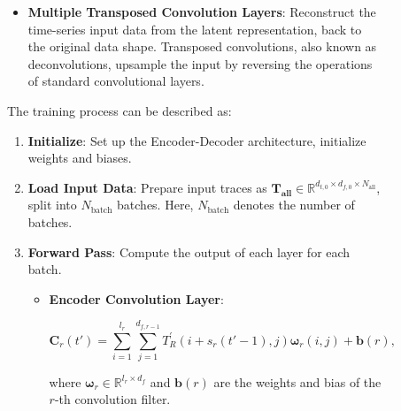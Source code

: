 \begin{figure}[!htbp]
{\begin{enumerate}
        \begin{itemize}
            \item \textbf{Multiple Transposed Convolution Layers}: Reconstruct the time-series input data from the latent representation, back to the original data shape. Transposed convolutions, also known as deconvolutions, upsample the input by reversing the operations of standard convolutional layers.
        \end{itemize}
\end{enumerate}
The training process can be described as:
\begin{enumerate}
\setcounter{enumi}{0}
\renewcommand{\theenumi}{\Roman{enumi}}
\renewcommand{\labelenumi}{\theenumi)}
    \item \textbf{Initialize}: Set up the Encoder-Decoder architecture, initialize weights and biases.
    \item \textbf{Load Input Data}: Prepare input traces as $\mathbf{T_{\text{all}}} \in \mathbb{R}^{ d_{t,0} \times d_{f,0} \times N_{\text{all}}}$, split into $N_{\text{batch}}$ batches. Here, $N_{\text{batch}}$ denotes the number of batches.
    \item \textbf{Forward Pass}: Compute the output of each layer for each batch.
    
    \begin{itemize}
        \item \textbf{Encoder Convolution Layer}:
        \begin{footnotesize}
        \begin{equation}
        \boldsymbol{C}_r(t') = \sum_{i=1}^{l_r} \sum_{j=1}^{d_{f, r-1}} T^{'}_R(i+s_r(t'-1), j) \boldsymbol{\omega}_r(i, j) + \boldsymbol{b}(r),
        \end{equation}
        \end{footnotesize}
        where $\boldsymbol{\omega}_r \in \mathbb{R}^{l_r \times d_f}$ and $\boldsymbol{b}(r)$ are the weights and bias of the $r$-th convolution filter.
        

\end{itemize}
\end{enumerate}}
\end{figure}

